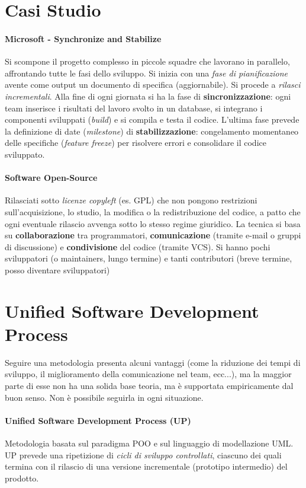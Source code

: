 \section{Casi Studio}

\paragraph{Microsoft - Synchronize and Stabilize} Si scompone il progetto complesso in piccole squadre che lavorano in parallelo, affrontando tutte le fasi dello sviluppo. Si inizia con una \textit{fase di pianificazione} avente come output un documento di specifica (aggiornabile). Si procede a \textit{rilasci incrementali}. Alla fine di ogni giornata si ha la fase di \textbf{sincronizzazione}: ogni team inserisce i risultati del lavoro svolto in un database, si integrano i componenti sviluppati (\textit{build}) e si compila e testa il codice. L'ultima fase prevede la definizione di date (\textit{milestone}) di \textbf{stabilizzazione}: congelamento momentaneo delle specifiche (\textit{feature freeze}) per risolvere errori e consolidare il codice sviluppato. 

\paragraph{Software Open-Source} Rilasciati sotto \textit{licenze copyleft} (es. GPL) che non pongono restrizioni sull'acquisizione, lo studio, la modifica o la redistribuzione del codice, a patto che ogni eventuale rilascio avvenga sotto lo stesso regime giuridico. La tecnica si basa su \textbf{collaborazione} tra programmatori, \textbf{comunicazione} (tramite e-mail o gruppi di discussione) e \textbf{condivisione} del codice (tramite VCS). Si hanno pochi sviluppatori (o maintainers, lungo termine) e tanti contributori (breve termine, posso diventare sviluppatori)

\section{Unified Software Development Process}
Seguire una metodologia presenta alcuni vantaggi (come la riduzione dei tempi di sviluppo, il miglioramento della comunicazione nel team, ecc...), ma la maggior parte di esse non ha una solida base teoria, ma è supportata empiricamente dal buon senso. Non è  possibile seguirla in ogni situazione.

\paragraph{Unified Software Development Process (UP)} Metodologia basata sul paradigma POO e sul linguaggio di modellazione UML. UP prevede una ripetizione di \textit{cicli di sviluppo controllati}, ciascuno dei quali termina con il rilascio di una versione incrementale (prototipo intermedio) del prodotto.

